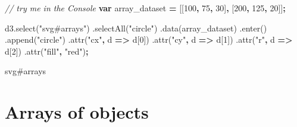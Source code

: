 \documentclass[openany]{book}
\newenvironment{Shaded}{\begin{snugshade}}{\end{snugshade}}
\newcommand{\AttributeTok}[1]{\textcolor[rgb]{0.77,0.63,0.00}{#1}}
\newcommand{\CommentTok}[1]{\textcolor[rgb]{0.56,0.35,0.01}{\textit{#1}}}
\newcommand{\DecValTok}[1]{\textcolor[rgb]{0.00,0.00,0.81}{#1}}
\newcommand{\KeywordTok}[1]{\textcolor[rgb]{0.13,0.29,0.53}{\textbf{#1}}}
\newcommand{\NormalTok}[1]{#1}
\newcommand{\OperatorTok}[1]{\textcolor[rgb]{0.81,0.36,0.00}{\textbf{#1}}}
\newcommand{\StringTok}[1]{\textcolor[rgb]{0.31,0.60,0.02}{#1}}
\newcommand{\VariableTok}[1]{\textcolor[rgb]{0.00,0.00,0.00}{#1}}
\begin{document}
\begin{Shaded}
\begin{Highlighting}[]
\CommentTok{// try me in the Console }
\KeywordTok{var}\NormalTok{ array_dataset }\OperatorTok{=}\NormalTok{ [[}\DecValTok{100}\OperatorTok{,} \DecValTok{75}\OperatorTok{,} \DecValTok{30}\NormalTok{]}\OperatorTok{,}\NormalTok{ [}\DecValTok{200}\OperatorTok{,} \DecValTok{125}\OperatorTok{,} \DecValTok{20}\NormalTok{]]}\OperatorTok{;}

\VariableTok{d3}\NormalTok{.}\AttributeTok{select}\NormalTok{(}\StringTok{"svg#arrays"}\NormalTok{)}
\NormalTok{  .}\AttributeTok{selectAll}\NormalTok{(}\StringTok{"circle"}\NormalTok{)}
\NormalTok{  .}\AttributeTok{data}\NormalTok{(array_dataset)}
\NormalTok{  .}\AttributeTok{enter}\NormalTok{()}
\NormalTok{  .}\AttributeTok{append}\NormalTok{(}\StringTok{"circle"}\NormalTok{)}
\NormalTok{    .}\AttributeTok{attr}\NormalTok{(}\StringTok{"cx"}\OperatorTok{,}\NormalTok{ d }\OperatorTok{=>}\NormalTok{ d[}\DecValTok{0}\NormalTok{])}
\NormalTok{    .}\AttributeTok{attr}\NormalTok{(}\StringTok{"cy"}\OperatorTok{,}\NormalTok{ d }\OperatorTok{=>}\NormalTok{ d[}\DecValTok{1}\NormalTok{])}
\NormalTok{    .}\AttributeTok{attr}\NormalTok{(}\StringTok{"r"}\OperatorTok{,}\NormalTok{ d }\OperatorTok{=>}\NormalTok{ d[}\DecValTok{2}\NormalTok{])}
\NormalTok{    .}\AttributeTok{attr}\NormalTok{(}\StringTok{"fill"}\OperatorTok{,} \StringTok{"red"}\NormalTok{)}\OperatorTok{;}
\end{Highlighting}
\end{Shaded}

svg\#arrays

\hypertarget{arrays-of-objects}{%
\section{Arrays of objects}\label{arrays-of-objects}}
\end{document}
